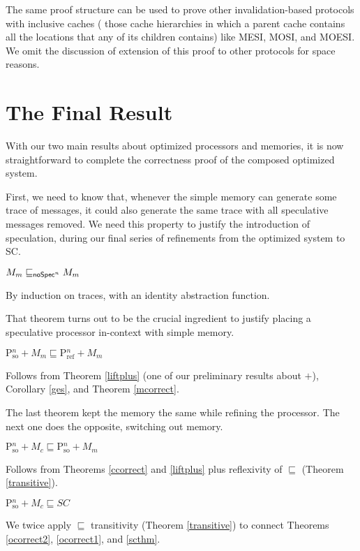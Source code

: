 The same proof structure can be used to prove other invalidation-based
protocols with inclusive caches (\ie{} those cache hierarchies in which a
parent cache contains all the locations that any of its children contains) like
MESI, MOSI, and MOESI. We omit the discussion of extension of this proof to
other protocols for space reasons.

\section{The Final Result}\label{sec:finalresult}

With our two main results about optimized processors and memories, it
is now straightforward to complete the correctness proof of the
composed optimized system.

First, we need to know that, whenever the simple memory can generate
some trace of messages, it could also generate the same trace with all
speculative messages removed.  We need this property to justify the
introduction of speculation, during our final series of refinements
from the optimized system to SC.

\begin{theorem}
\label{mcorrect}
$M_m \sqsubseteq_{\mathsf{noSpec}^n} M_m$
\end{theorem}
\begin{prf}
By induction on traces, with an identity abstraction function.
\end{prf}

That theorem turns out to be the crucial ingredient to justify placing
a speculative processor in-context with simple memory.

\begin{theorem}
\label{ocorrect1}
$\text{P$^n_\text{so}$} + M_m \sqsubseteq \text{P$^n_\text{ref}$} + M_m$
\end{theorem}
\begin{prf}
Follows from Theorem \ref{liftplus} (one of our preliminary results
about $+$), Corollary \ref{ges}, and Theorem \ref{mcorrect}.
\end{prf}

The last theorem kept the memory the same while refining the
processor.  The next one does the opposite, switching out memory.

\begin{theorem}
\label{ocorrect2}
$\text{P$^n_\text{so}$} + M_c \sqsubseteq \text{P$^n_\text{so}$} + M_m$
\end{theorem}
\begin{prf}
Follows from Theorems \ref{ccorrect} and \ref{liftplus} plus reflexivity of $\sqsubseteq$ (Theorem \ref{transitive}).
\end{prf}

\begin{theorem}
\label{ofull}
$\text{P$^n_\text{so}$} + M_c \sqsubseteq SC$
\end{theorem}
\begin{prf}
We twice apply $\sqsubseteq$ transitivity (Theorem \ref{transitive}) to
connect Theorems \ref{ocorrect2}, \ref{ocorrect1}, and \ref{scthm}.
\end{prf}
